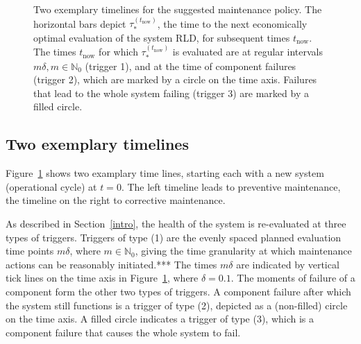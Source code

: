 \documentclass[authoryear]{elsarticle}
\newcommand{\naturals}{\mathbb{N}}
\def\tnow{t_\text{now}}
\newcommand{\tausnow}{\tau_*^{(\tnow)}}
\newcommand{\tthresh}{\tau_{\text{thresh}}}
\begin{document}
\begin{figure}
\caption{Two exemplary timelines for the suggested maintenance policy.
The horizontal bars depict $\tausnow$,
the time to the next economically optimal evaluation of the system RLD,
for subsequent times $\tnow$.
The times $\tnow$ for which $\tausnow$ is evaluated are
at regular intervals $m \delta, m \in \naturals_0$ (trigger 1),
and at the time of component failures (trigger 2),
which are marked by a circle on the time axis.
Failures that lead to the whole system failing (trigger 3) are marked by a filled circle.}
\label{fig:timeline}
\end{figure}


\subsection{Two exemplary timelines}
\label{sec:policy-example}

Figure~\ref{fig:timeline} shows two examplary time lines,
starting each with a new system (operational cycle) at $t=0$.
The left timeline leads to preventive maintenance,
the timeline on the right to corrective maintenance.

As described in Section~\ref{intro},
the health of the system is re-evaluated at three types of triggers.
Triggers of type (1) are the evenly spaced planned evaluation time points $m\delta$, where $m \in \naturals_0$,
giving the time granularity at which maintenance actions can be reasonably initiated.***
The times $m\delta$ are indicated by vertical tick lines on the time axis in Figure~\ref{fig:timeline},
where $\delta = 0.1$.
The moments of failure of a component form the other two types of triggers.
A component failure after which the system still functions is a trigger of type (2),
depicted as a (non-filled) circle on the time axis.
A filled circle indicates a trigger of type (3),
which is a component failure that causes the whole system to fail.
\end{document}
